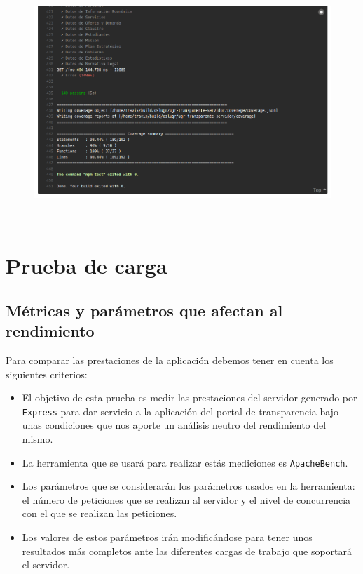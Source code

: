 \begin{figure}[!ht]
	\begin{center}
		\includegraphics[width=1\textwidth]{../images/integracion_continua_03.png}
		\caption{}
		\label{fig:integracion_continua_03}
	\end{center}
\end{figure}

\newpage \
\newpage \
\newpage \
\newpage \
\newpage \
\section{Prueba de carga}

\subsection{Métricas y parámetros que afectan al rendimiento}

Para comparar las prestaciones de la aplicación debemos tener en cuenta los siguientes criterios:

\begin{itemize}
	\item El objetivo de esta prueba es medir las prestaciones del servidor generado por {\tt Express} para dar servicio a la aplicación del portal de transparencia bajo unas condiciones que nos aporte un análisis neutro del rendimiento del mismo.
	\item La herramienta que se usará para realizar estás mediciones es {\tt ApacheBench}.
	\item Los parámetros que se considerarán los parámetros usados en la herramienta: el número de peticiones que se realizan al servidor y el nivel de concurrencia con el que se realizan las peticiones.
	\item Los valores de estos parámetros irán modificándose para tener unos resultados más completos ante las diferentes cargas de trabajo que soportará el servidor.
\end{itemize}

